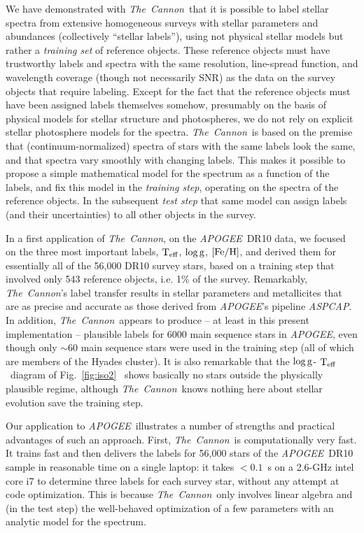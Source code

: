 \documentclass[12pt, preprint]{aastex}
\newcommand{\tc}{\textsl{The~Cannon}}
\newcommand{\apogee}{\textsl{APOGEE}}
\newcommand{\aspcap}{\textsl{ASPCAP}}
\newcommand{\teff}{\mbox{$\rm T_{eff}$}}
\newcommand{\feh}{\mbox{$\rm [Fe/H]$}}
\newcommand{\logg}{\mbox{$\rm \log g$}}
\begin{document}
We have demonstrated with \tc\ that it is possible to label stellar
spectra from extensive homogeneous surveys with stellar parameters 
and abundances (collectively ``stellar labels''), using not physical stellar models but rather a
\emph{training set} of reference objects. These reference objects must have trustworthy
labels and spectra with the same resolution, line-spread function, and
wavelength coverage (though not necessarily SNR) as the data on the 
survey objects that require labeling.
Except for the fact that the reference objects must have been assigned
labels themselves somehow, presumably on the basis of physical models for stellar 
structure and photospheres, we do not rely on explicit stellar photosphere models
for the spectra. \tc\  is based on the premise that (continuum-normalized) spectra of stars with the same labels
look the same, and that spectra vary smoothly with changing labels. 
This makes it possible to propose a simple mathematical model for the spectrum as a function of the
labels, and fix this model in the \textit{training step}, operating on the spectra of the reference objects.
In the subsequent \textit{test step} that same model can assign labels (and their uncertainties) to all
other objects in the survey.

In a first application of \tc, on the \apogee\ DR10 data, we focused on the three most important labels, \teff, \logg, \feh , and 
derived them for essentially all of the 56,000 DR10 survey stars, based on a training step that involved only 543 reference objects, i.e. 1\% of the survey.  Remarkably, \tc 's label transfer results in stellar parameters and metallicites that are as precise and accurate as those derived from
\apogee 's pipeline \aspcap. In addition, \tc\ appears to produce -- at least in this present implementation -- plausible labels for 6000 main sequence stars in \apogee, even though only $\sim 60$ main sequence stars were used in the training step (all of which are members of the Hyades cluster). 
It is also remarkable that  the \logg - \teff\  diagram of Fig.~\ref{fig:iso2}~ shows basically no stars outside
the physically plausible regime, although \tc\ knows nothing here about stellar evolution save the training step.

Our application to \apogee\  illustrates a number of strengths and practical advantages of such an approach. First, \tc\ is computationally very fast. It  trains fast and then delivers the labels for 56,000 stars of the
 \apogee\ DR10 sample in reasonable time on a single laptop: it takes $<0.1$~s on a 2.6-GHz
intel core i7 to determine three labels for each survey star, without any
attempt at code optimization. This is because \tc\  only involves linear algebra and (in the test step) the well-behaved optimization of a few parameters with an analytic model for the spectrum. 
\end{document}
